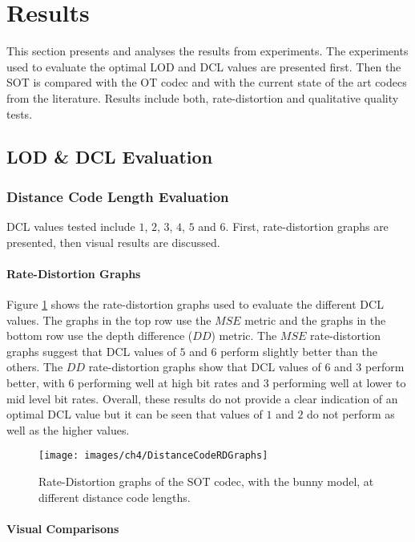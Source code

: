 \section{Results}

This section presents and analyses the results from experiments. The experiments used to evaluate the optimal LOD and DCL values are presented first. Then the SOT is compared with the OT codec and with the current state of the art codecs from the literature. Results include both, rate-distortion and qualitative quality tests. 

\subsection{LOD \& DCL Evaluation}

\subsubsection{Distance Code Length Evaluation}

DCL values tested include $1$, $2$, $3$, $4$, $5$ and $6$. First, rate-distortion graphs are presented, then visual results are discussed.

\paragraph{Rate-Distortion Graphs}

Figure \ref{DistanceCodeRDGraphs} shows the rate-distortion graphs used to evaluate the different DCL values. The graphs in the top row use the $MSE$ metric and the graphs in the bottom row use the depth difference ($DD$) metric. The $MSE$ rate-distortion graphs suggest that DCL values of $5$ and $6$ perform slightly better than the others. The $DD$ rate-distortion graphs show that DCL values of $6$ and $3$ perform better, with $6$ performing well at high bit rates and $3$ performing well at lower to mid level bit rates. Overall, these results do not provide a clear indication of an optimal DCL value but it can be seen that values of $1$ and $2$ do not perform as well as the higher values.

\begin{figure}[!h]
\centering
\texttt{[image: images/ch4/DistanceCodeRDGraphs]}
\caption{Rate-Distortion graphs of the SOT codec, with the bunny model, at different distance code lengths.}
\label{DistanceCodeRDGraphs}
\end{figure}

\paragraph{Visual Comparisons}

